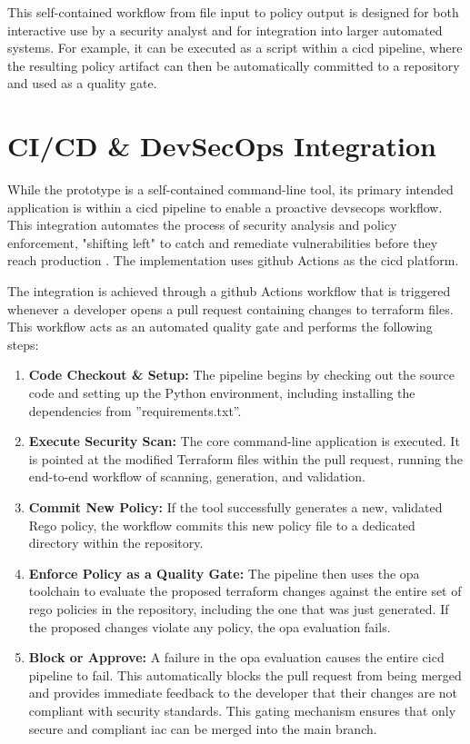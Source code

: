 This self-contained workflow from file input to policy output is designed for both interactive use by a security analyst and for integration into larger automated systems. For example, it can be executed as a script within a \gls{cicd} pipeline, where the resulting policy artifact can then be automatically committed to a repository and used as a quality gate.

\section{CI/CD \& DevSecOps Integration}

While the prototype is a self-contained command-line tool, its primary intended application is within a \gls{cicd} pipeline to enable a proactive \gls{devsecops} workflow. This integration automates the process of security analysis and policy enforcement, "shifting left" to catch and remediate vulnerabilities before they reach production \cite{delicheh_mitigating_2024}. The implementation uses \gls{github} Actions as the \gls{cicd} platform.

The integration is achieved through a \gls{github} Actions workflow that is triggered whenever a developer opens a pull request containing changes to \gls{terraform} files. This workflow acts as an automated quality gate and performs the following steps:

\begin{enumerate}
    \item \textbf{Code Checkout \& Setup:} The pipeline begins by checking out the source code and setting up the Python environment, including installing the dependencies from ''requirements.txt''.
    \item \textbf{Execute Security Scan:} The core command-line application is executed. It is pointed at the modified Terraform files within the pull request, running the end-to-end workflow of scanning, generation, and validation.
    \item \textbf{Commit New Policy:} If the tool successfully generates a new, validated Rego policy, the workflow commits this new policy file to a dedicated directory within the repository.
    \item \textbf{Enforce Policy as a Quality Gate:} The pipeline then uses the \gls{opa} toolchain to evaluate the proposed \gls{terraform} changes against the entire set of \gls{rego} policies in the repository, including the one that was just generated. If the proposed changes violate any policy, the \gls{opa} evaluation fails.
    \item \textbf{Block or Approve:} A failure in the \gls{opa} evaluation causes the entire \gls{cicd} pipeline to fail. This automatically blocks the pull request from being merged and provides immediate feedback to the developer that their changes are not compliant with security standards. This gating mechanism ensures that only secure and compliant \gls{iac} can be merged into the main branch.
\end{enumerate}

